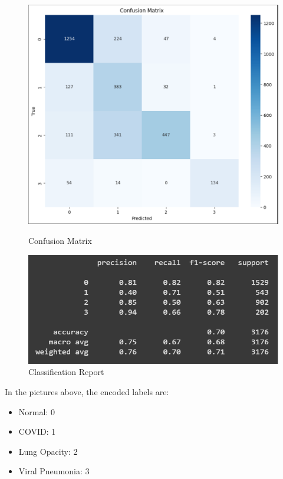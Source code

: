 \documentclass{article}
\begin{document}
\begin{figure}[H]
    \centering
    \begin{minipage}[t]{0.48\textwidth}
        \centering
        \includegraphics[width=\linewidth]{DN121cm1.png}
        \caption{Confusion Matrix}
        \label{fig:DN121cm1}
    \end{minipage}
    \hfill
    \begin{minipage}[t]{0.48\textwidth}
        \centering
        \includegraphics[width=\linewidth]{DN121cr1.png}
        \caption{Classification Report}
        \label{fig:DN121cr1}
    \end{minipage}
\end{figure}

In the pictures above, the encoded labels are:
\begin{itemize}
    \item Normal: 0
    \item COVID: 1
    \item Lung Opacity: 2
    \item Viral Pneumonia: 3
\end{itemize}
\end{document}
